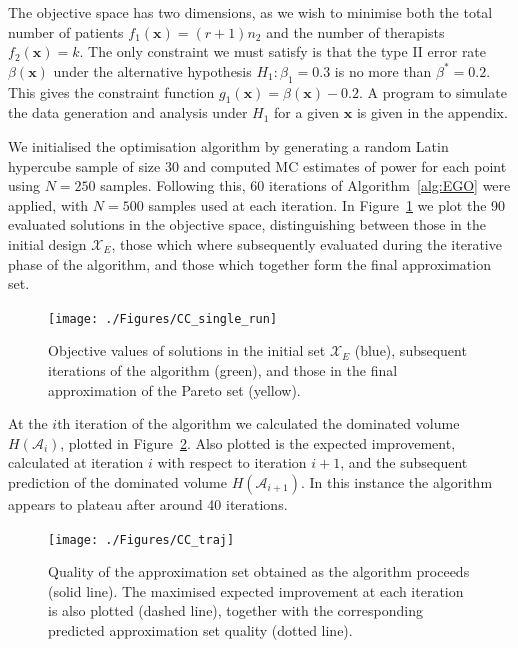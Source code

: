 \documentclass{article} %
\begin{document}

The objective space has two dimensions, as we wish to minimise both the total number of patients $f_{1}(\mathbf{x}) = (r+1)n_{2}$ and the number of therapists $f_{2}(\mathbf{x}) = k$. The only constraint we must satisfy is that the type II error rate $\beta(\mathbf{x})$ under the alternative hypothesis $H_{1}: \beta_{1} = 0.3$ is no more than $\beta^{*} = 0.2$. This gives the constraint function $g_{1}(\mathbf{x}) = \beta(\mathbf{x}) - 0.2$. A program to simulate the data generation and analysis under $H_{1}$ for a given $\mathbf{x}$ is given in the appendix.

We initialised the optimisation algorithm by generating a random Latin hypercube sample of size 30 and computed MC estimates of power for each point using $N = 250$ samples. Following this, 60 iterations of Algorithm~\ref{alg:EGO} were applied, with $N = 500$ samples used at each iteration. In Figure~\ref{fig:CC_single_run} we plot the 90 evaluated solutions in the objective space, distinguishing between those in the initial design $\mathcal{X}_{E}$, those which where subsequently evaluated during the iterative phase of the algorithm, and those which together form the final approximation set.

\begin{figure}
\centering
\texttt{[image: ./Figures/CC\_single\_run]}
\caption{Objective values of solutions in the initial set $\mathcal{X}_{E}$ (blue), subsequent iterations of the algorithm (green), and those in the final approximation of the Pareto set (yellow).}
\label{fig:CC_single_run}
\end{figure}

At the $i$th iteration of the algorithm we calculated the dominated volume $H(\mathcal{A}_{i})$, plotted in Figure~\ref{fig:CC_traj}. Also plotted is the expected improvement, calculated at iteration $i$ with respect to iteration $i+1$, and the subsequent prediction of the dominated volume $H(\mathcal{A}_{i+1})$. In this instance the algorithm appears to plateau after around 40 iterations.

\begin{figure}
\centering
\texttt{[image: ./Figures/CC\_traj]}
\caption{Quality of the approximation set obtained as the algorithm proceeds (solid line). The maximised expected improvement at each iteration is also plotted (dashed line), together with the corresponding predicted approximation set quality (dotted line).}
\label{fig:CC_traj}
\end{figure}
\end{document}
